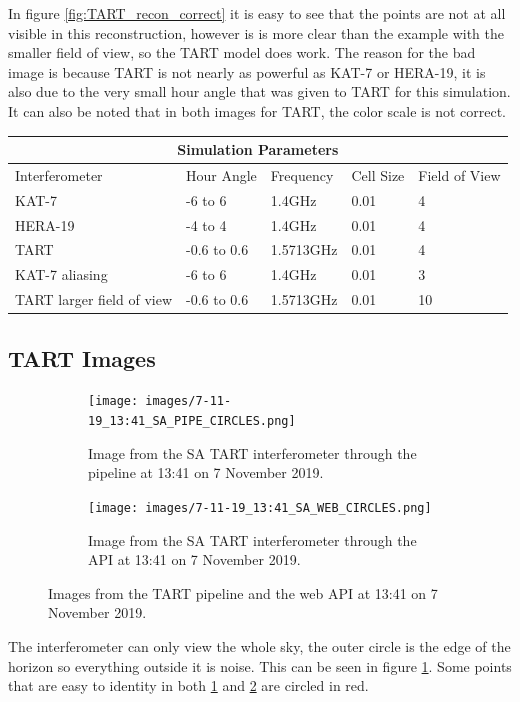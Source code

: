 In figure \ref{fig:TART_recon_correct} it is easy to see that the points are not at all visible in this reconstruction, however is is more clear than the example with the smaller field of view, so the TART model does work. The reason for the bad image is because TART is not nearly as powerful as KAT-7 or HERA-19, it is also due to the very small hour angle that was given to TART for this simulation.
It can also be noted that in both images for TART, the color scale is not correct.
\\
\begin{table}[H]
    \centering
    \begin{tabular}{ |p{}||p{}|p{}|p{}| p{}| }
     \hline
     \multicolumn{5}{|c|}{Simulation Parameters} \\
     \hline
     Interferometer & Hour Angle & Frequency & Cell Size & Field of View \\
     \hline
     KAT-7 & -6 to 6 & 1.4GHz & 0.01 & 4 \\
     HERA-19 & -4 to 4 & 1.4GHz & 0.01 & 4 \\
     TART & -0.6 to 0.6 & 1.5713GHz & 0.01 & 4 \\
     KAT-7 aliasing & -6 to 6 & 1.4GHz & 0.01 & 3 \\
     TART larger field of view & -0.6 to 0.6 & 1.5713GHz & 0.01 & 10 \\
     \hline
    \end{tabular}
    
\end{table}

\subsection{TART Images}
\FloatBarrier
\begin{figure}[H]
  \centering
  \begin{subfigure}[b]{0.49\textwidth}
    \centering
    \texttt{[image: images/7-11-19\_13:41\_SA\_PIPE\_CIRCLES.png]}
    \caption{Image from the SA TART interferometer through the pipeline at 13:41 on 7 November 2019.}
    \label{fig:TART_SA}
  \end{subfigure}
  \begin{subfigure}[b]{0.49\textwidth}
    \centering
    \texttt{[image: images/7-11-19\_13:41\_SA\_WEB\_CIRCLES.png]}
    \vspace*{6mm}
    \caption{Image from the SA TART interferometer through the API at 13:41 on 7 November 2019.}
    \label{fig:TART_SA_WEB}
  \end{subfigure}
  \caption{Images from the TART pipeline and the web API at 13:41 on 7 November 2019.}
  \label{fig:TART_RESULTS}
\end{figure}
The interferometer can only view the whole sky, the outer circle is the edge of the horizon so everything outside it is noise. This can be seen in figure \ref{fig:TART_SA}. Some points that are easy to identity in both \ref{fig:TART_SA} and \ref{fig:TART_SA_WEB} are circled in red.

